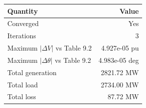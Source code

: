 \begin{tabular}{@{}lr@{}}\toprule Quantity & Value\\ \midrule
Converged & Yes\\
Iterations & 3\\
Maximum $|\Delta V|$ vs Table 9.2 & 4.927e-05 pu\\
Maximum $|\Delta \theta|$ vs Table 9.2 & 4.983e-05 deg\\
Total generation & 2821.72 MW\\
Total load & 2734.00 MW\\
Total loss & 87.72 MW\\
\bottomrule\end{tabular}
